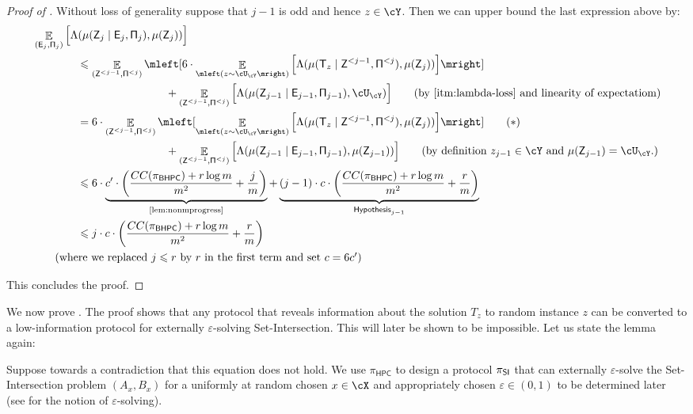 \documentclass[11pt,letterpaper]{article}
\newcommand{\eps}{\varepsilon}
\newcommand{\HPC}{\mathsf{HPC}}
\DeclareMathOperator*{\E}{\mathbb{E}}
\renewcommand{\leq}{\leqslant}
\theoremstyle{definition}
\newcommand{\bhpc}{\ensuremath{\textnormal{\textsf{BHPC}}}\xspace}
\newcommand{\Bracket}[1]{\Big[#1\Big]}
\newcommand{\bracket}[1]{\mleft[#1\mright]}
\newcommand{\paren}[1]{\ensuremath{\mleft(#1\mright)}\xspace}
\newcommand{\Prot}{\ensuremath{\Pi}}
\newcommand{\prot}{\ensuremath{\pi}}
\newcommand{\rv}[1]{\ensuremath{\mathsf{#1}}}
\newcommand{\protHPC}{\ensuremath{\prot_{\HPC}}}
\newcommand{\rZ}{\rv{Z}}
\newcommand{\rT}{\rv{T}}
\newcommand{\rE}{\rv{E}}
\newcommand{\rProt}{\rv{\Prot}}
\newcommand{\protSI}{\ensuremath{\prot}_{\ensuremath{\textnormal{\textsf{SI}}}}\xspace}
\begin{document}
\begin{proof}[Proof of ]
	Without loss of generality suppose that $j-1$ is odd and hence $z \in \cY$. Then 
	we can upper bound the last expression above by:
	\begin{align*}
		&\E_{(\rE_j,\rProt_j)} \Bracket{\Lambda(\mu(\rZ_j \mid \rE_j,\rProt_j),\mu(\rZ_j))}  \\
		&\qquad \qquad \leq \E_{(\rZ^{<j-1},\rProt^{<j})} \bracket{6 \cdot \E_{\paren{z \sim \cU_{\cY}}}\Bracket{\Lambda(\mu(\rT_{z} \mid \rZ^{<j-1},\rProt^{<j}),\mu(\rZ_j))}} \\
		 &\qquad \qquad  \qquad \qquad \qquad  \qquad + \E_{(\rZ^{<j-1},\rProt^{<j})} \Bracket{\Lambda(\mu(\rZ_{j-1} \mid \rE_{j-1},\rProt_{j-1}),\cU_\cY)} %
   \tag{by \Cref{itm:lambda-loss} and linearity of expectatiom}
   \\
   &\qquad \qquad = 6 \cdot\E_{(\rZ^{<j-1},\rProt^{<j})} \bracket{ \E_{\paren{z \sim \cU_{\cY}}}\Bracket{\Lambda(\mu(\rT_{z} \mid \rZ^{<j-1},\rProt^{<j}),\mu(\rZ_j))}} \tag{$\ast$}\label{eq:final-inequality}\\
		 &\qquad \qquad  \qquad \qquad \qquad  \qquad + \E_{(\rZ^{<j-1},\rProt^{<j})} \Bracket{\Lambda(\mu(\rZ_{j-1} \mid \rE_{j-1},\rProt_{j-1}),\mu(\rZ_{j-1}))}\tag{by definition $z_{j-1} \in \cY$ and $\mu(\rZ_{j-1}) = \cU_\cY$.}\\
   &\qquad \qquad\leq 6 \cdot \underbrace{c' \cdot \left( \frac{CC(\pi_\bhpc)+r\log m}{m^2} + \frac{j} m\right)}_{\text{\Cref{lem:nonmprogress}}} + \underbrace{(j-1) \cdot c \cdot \left( \frac{CC(\pi_\bhpc)+r\log m}{m^2} + \frac{r} m\right)}_{\mathsf{Hypothesis}_{j-1}}\\
  & \qquad \qquad\leq j \cdot c \cdot \left( \frac{CC(\pi_\bhpc)+r\log m}{m^2} + \frac{r} m\right) \\
  &\tag{where we replaced $j \leq r$ by $r$ in the first term and set $c = 6c'$}
	\end{align*}

This concludes the proof.
\end{proof}


\bigskip\noindent
We now prove . The proof shows that any protocol that reveals information about the solution $T_z$ to random instance $z$ can be converted to a low-information protocol for externally $\eps$-solving Set-Intersection. This will later be shown to be impossible. Let us state the lemma again:

\nonmprogress*
Suppose towards a contradiction that this equation does not hold. We use $\protHPC$ to design a protocol $\protSI$
	that can externally $\eps$-solve the Set-Intersection problem $(A_x,B_x)$ for a uniformly at random chosen $x \in \cX$ and appropriately chosen $\eps \in (0,1)$ to be determined later (see  for the notion of $\eps$-solving). 
	
\end{document}
